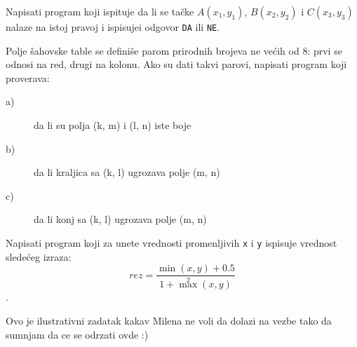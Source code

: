 \begin{Exercise}[label=p1_20]
Napisati program koji ispituje da li se ta\v cke $A(x_1, y_1)$, $B(x_2,
y_2)$ i $C(x_3, y_3)$ nalaze na istoj pravoj i
ispisujei odgovor \verb|DA| ili \verb|NE|. \\
\end{Exercise}
\begin{Answer}[ref=p1_20]
\end{Answer}

\begin{Exercise}[label=p1_21]
Polje šahovske table se definiše parom prirodnih brojeva ne većih od $8$: prvi se odnosi na red, drugi na kolonu. Ako su dati takvi
parovi, napisati program koji proverava: \\
\begin{description}
\item[a)] da li su polja (k, m) i (l, n) iste boje
\item[b)] da li kraljica sa (k, l) ugrozava polje (m, n)
\item[c)] da li konj sa (k, l) ugrozava polje (m, n)
\end{description}
\end{Exercise}
\begin{Answer}[ref=p1_21]
\end{Answer}


\begin{Exercise}[label=p1_22]
Napisati program koji za unete vrednosti promenljivih \verb|x| i
\verb|y| ispisuje vrednost sledećeg izraza:
 $$rez = \frac{\min(x, y) + 0.5}{1 + \max^2(x, y)}$$. \\
\end{Exercise}
\begin{Answer}[ref=p1_22]
\end{Answer}

\begin{Exercise}[label=p1_23]
Ovo je ilustrativni zadatak kakav Milena ne voli da dolazi na vezbe tako da sumnjam da ce se odrzati ovde :) \\
\end{Exercise}
\begin{Answer}[ref=p1_23]
\end{Answer}

